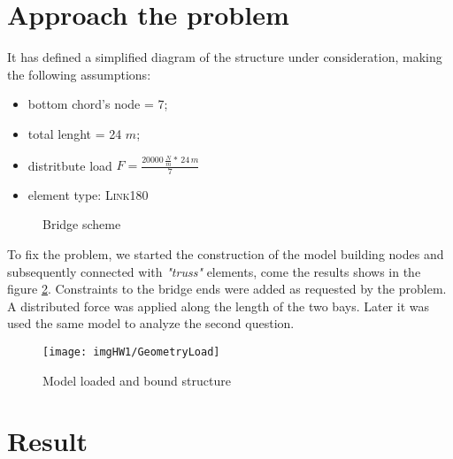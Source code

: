 \section{Approach the problem}
It has defined a simplified diagram of the structure under consideration, making the following assumptions:\\
\begin{itemize}
\item bottom chord's node = 7;
\item total lenght = 24 $m$;
\item distritbute load $F = \frac{20000\,\frac{N}{m}*\, 24\,m}{7}$
\item element type: \textsc{Link180}
\end{itemize}
\begin{figure}[!h]
\centering
    \resizebox{.8\linewidth}{!}{}
\caption{Bridge scheme}
\label{img:HW1:Sche}
\end{figure}
\noindent To fix the problem, we started the construction of the model building nodes and subsequently connected with \emph{"truss"} elements, come the results shows in the figure \ref{img:HW1-modelGeom}.
Constraints to the bridge ends were added as requested by the problem. A distributed force was applied along the length of the two bays.
Later it was used the same model to analyze the second question.
\begin{figure}[!h]
\centering
\texttt{[image: imgHW1/GeometryLoad]}
\caption{Model loaded and bound structure}
\label{img:HW1-modelGeom}
\end{figure}
\section{Result}
